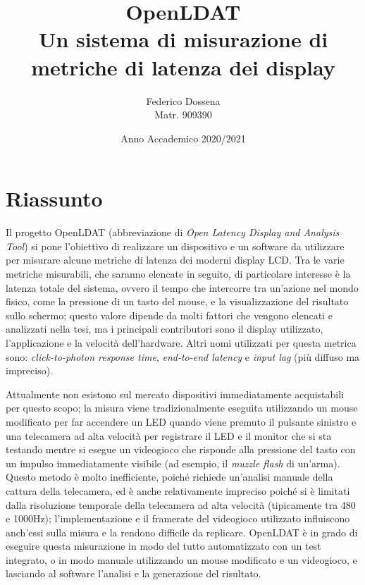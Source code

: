 \documentclass[a4paper]{article}
\title{OpenLDAT\\Un sistema di misurazione di metriche di latenza dei display}
\author{Federico Dossena\\Matr. 909390}
\date{Anno Accademico 2020/2021}
\begin{document}
\maketitle

\sloppy
\setlength{\parskip}{8pt}
\setlength{\parindent}{0pt}
\section*{Riassunto}
Il progetto OpenLDAT (abbreviazione di \textit{Open Latency Display and Analysis Tool}) si pone l'obiettivo di realizzare un dispositivo e un software da utilizzare per misurare alcune metriche di latenza dei moderni display LCD. Tra le varie metriche misurabili, che saranno elencate in seguito, di particolare interesse è la latenza totale del sistema, ovvero il tempo che intercorre tra un'azione nel mondo fisico, come la pressione di un tasto del mouse, e la visualizzazione del risultato sullo schermo; questo valore dipende da molti fattori che vengono elencati e analizzati nella tesi, ma i principali contributori sono il display utilizzato, l'applicazione e la velocità dell'hardware. Altri nomi utilizzati per questa metrica sono: \textit{click-to-photon response time}, \textit{end-to-end latency} e \textit{input lag} (più diffuso ma impreciso).

Attualmente non esistono sul mercato dispositivi immediatamente acquistabili per questo scopo; la misura viene tradizionalmente eseguita utilizzando un mouse modificato per far accendere un LED quando viene premuto il pulsante sinistro e una telecamera ad alta velocità per registrare il LED e il monitor che si sta testando mentre si esegue un videogioco che risponde alla pressione del tasto con un impulso immediatamente visibile (ad esempio, il \textit{muzzle flash} di un'arma). Questo metodo è molto inefficiente, poiché richiede un'analisi manuale della cattura della telecamera, ed è anche relativamente impreciso poiché si è limitati dalla risoluzione temporale della telecamera ad alta velocità (tipicamente tra 480 e 1000Hz); l'implementazione e il framerate del videogioco utilizzato influiscono anch'essi sulla misura e la rendono difficile da replicare. OpenLDAT è in grado di eseguire questa misurazione in modo del tutto automatizzato con un test integrato, o in modo manuale utilizzando un mouse modificato e un videogioco, e lasciando al software l'analisi e la generazione del risultato.
\end{document}
